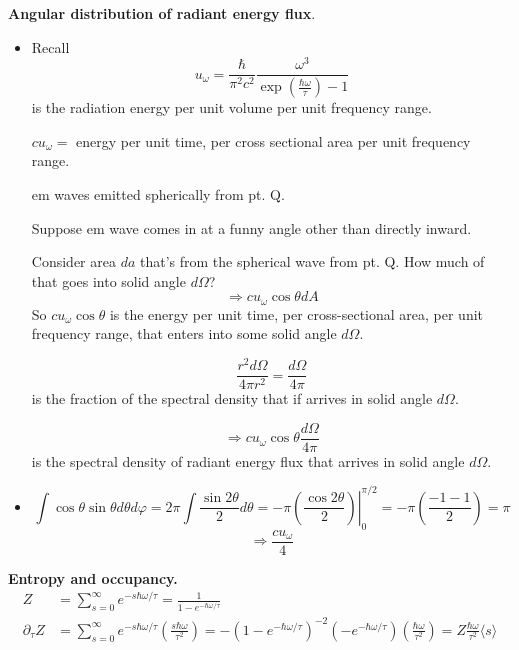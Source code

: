  \textbf{Angular distribution of radiant energy flux}.  

\begin{itemize}
\item[(a)] Recall 
\[
u_{\omega} = \frac{ \hbar}{ \pi^2 c^2} \frac{ \omega^3}{ \exp{ \left( \frac{ \hbar \omega}{ \tau } \right) } - 1 } 
\]
is the radiation energy per unit volume per unit frequency range.  

$cu_{\omega} = $ energy per unit time, per cross sectional area per unit frequency range.  

em waves emitted spherically from pt. Q.  

Suppose em wave comes in at a funny angle other than directly inward.  

Consider area $da$ that's from the spherical wave from pt. Q.  How much of that goes into solid angle $d\Omega$?
\[
\Longrightarrow cu_{\omega} \cos{\theta} dA
\]
So $c u_{\omega} \cos{\theta}$ is the energy per unit time, per cross-sectional area, per unit frequency range, that enters into some solid angle $d\Omega$.  

\[
\frac{ r^2 d\Omega}{ 4 \pi r^2} = \frac{ d \Omega }{ 4 \pi}
\]
is the fraction of the spectral density that if arrives in solid angle $d\Omega$.  

\[
\Longrightarrow \boxed{ cu_{ \omega} \cos{\theta} \frac{d\Omega}{ 4\pi} }
\]
is the spectral density of radiant energy flux that arrives in solid angle $d\Omega$.  
\item[(b)]
\[
\int \cos{\theta} \sin{\theta } d\theta d\varphi = 2\pi \int \frac{ \sin{2\theta}}{ 2} d\theta = - \pi \left. \left( \frac{ \cos{2 \theta}}{ 2 } \right) \right|_0^{\pi/2} = - \pi \left( \frac{ -1 -1 }{2} \right)  = \pi
\]
\[
\Longrightarrow \boxed{ \frac{ cu_{\omega} }{4} }
\]
\end{itemize}






 \textbf{Entropy and occupancy.} 
\[
\begin{aligned}
  Z & = \sum_{s=0}^{\infty} e^{-s\hbar \omega/ \tau} = \frac{1}{1- e^{-\hbar \omega/\tau}} \\
  \partial_{\tau} Z & = \sum_{s=0}^{\infty} e^{-s\hbar \omega/ \tau} \left( \frac{s \hbar \omega}{ \tau^2 } \right)  = - (1-  e^{-\hbar \omega/\tau} )^{-2} (-e^{-\hbar \omega/\tau} )\left( \frac{\hbar \omega}{\tau^2} \right)  = Z \frac{\hbar \omega}{\tau^2} \langle s \rangle
\end{aligned}
\]

